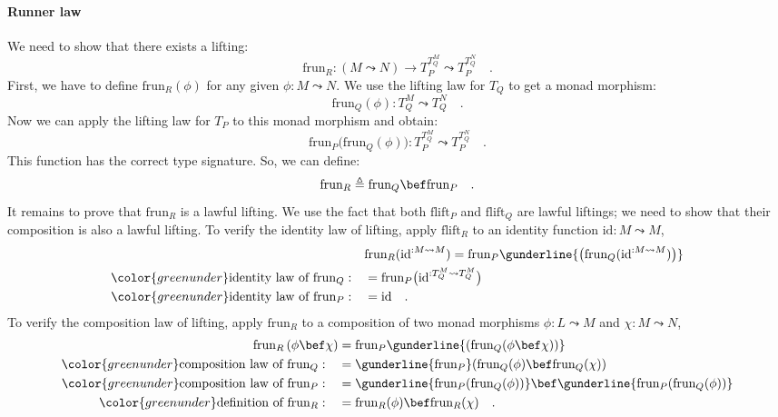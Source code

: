 \paragraph{Runner law}

We need to show that there exists a lifting:
\[
\text{frun}_{R}:\left(M\leadsto N\right)\rightarrow T_{P}^{T_{Q}^{M}}\leadsto T_{P}^{T_{Q}^{N}}\quad.
\]
First, we have to define $\text{frun}_{R}(\phi)$ for any given $\phi:M\leadsto N$.
We use the lifting law for $T_{Q}$ to get a monad morphism:
\[
\text{frun}_{Q}(\phi):T_{Q}^{M}\leadsto T_{Q}^{N}\quad.
\]
Now we can apply the lifting law for $T_{P}$ to this monad morphism
and obtain:
\[
\text{frun}_{P}\big(\text{frun}_{Q}(\phi)\big):T_{P}^{T_{Q}^{M}}\leadsto T_{P}^{T_{Q}^{N}}\quad.
\]
This function has the correct type signature. So, we can define:
\[
\text{frun}_{R}\triangleq\text{frun}_{Q}\bef\text{frun}_{P}\quad.
\]
It remains to prove that $\text{frun}_{R}$ is a lawful lifting. We
use the fact that both $\text{flift}_{P}$ and $\text{flift}_{Q}$
are lawful liftings; we need to show that their composition is also
a lawful lifting. To verify the identity law of lifting, apply $\text{flift}_{R}$
to an identity function $\text{id}:M\leadsto M$,
\begin{align*}
 & \text{frun}_{R}(\text{id}^{:M\leadsto M})=\text{frun}_{P}\gunderline{\big(\text{frun}_{Q}(\text{id}^{:M\leadsto M})\big)}\\
{\color{greenunder}\text{identity law of }\text{frun}_{Q}:}\quad & =\text{frun}_{P}\big(\text{id}^{:T_{Q}^{M}\leadsto T_{Q}^{M}}\big)\\
{\color{greenunder}\text{identity law of }\text{frun}_{P}:}\quad & =\text{id}\quad.
\end{align*}
To verify the composition law of lifting, apply $\text{frun}_{R}$
to a composition of two monad morphisms $\phi:L\leadsto M$ and $\chi:M\leadsto N$,
\begin{align*}
\text{frun}_{R}\left(\phi\bef\chi\right) & =\text{frun}_{P}\gunderline{(\text{frun}_{Q}(\phi\bef\chi))}\\
{\color{greenunder}\text{composition law of }\text{frun}_{Q}:}\quad & =\gunderline{\text{frun}_{P}}(\text{frun}_{Q}(\phi)\bef\text{frun}_{Q}(\chi))\\
{\color{greenunder}\text{composition law of }\text{frun}_{P}:}\quad & =\gunderline{\text{frun}_{P}(\text{frun}_{Q}(\phi))}\bef\gunderline{\text{frun}_{P}(\text{frun}_{Q}(\phi))}\\
{\color{greenunder}\text{definition of }\text{frun}_{R}:}\quad & =\text{frun}_{R}(\phi)\bef\text{frun}_{R}(\chi)\quad.
\end{align*}


